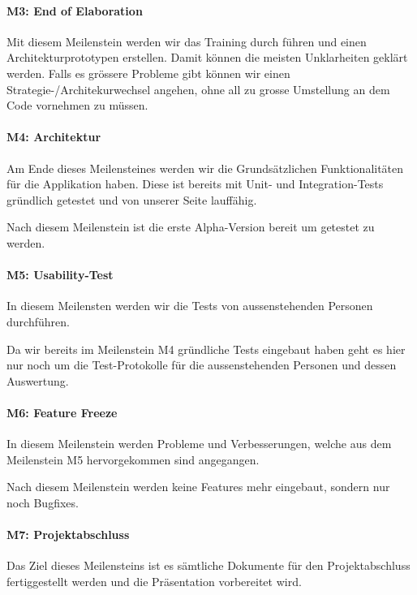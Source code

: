 \documentclass[a4paper]{article}
\begin{document}
\paragraph{M3: End of Elaboration} 

Mit diesem Meilenstein werden wir das Training durch führen und einen Architekturprototypen erstellen.
Damit können die meisten Unklarheiten geklärt werden.
Falls es grössere Probleme gibt können wir einen Strategie-/Architekurwechsel angehen, ohne all zu grosse Umstellung an dem Code vornehmen zu müssen.

\paragraph{M4: Architektur} 

Am Ende dieses Meilensteines werden wir die Grundsätzlichen Funktionalitäten für die Applikation haben.
Diese ist bereits mit Unit- und Integration-Tests gründlich getestet und von unserer Seite lauffähig.

Nach diesem Meilenstein ist die erste Alpha-Version bereit um getestet zu werden.

\paragraph{M5: Usability-Test} 

In diesem Meilensten werden wir die Tests von aussenstehenden Personen durchführen.

Da wir bereits im Meilenstein M4 gründliche Tests eingebaut haben geht es hier nur noch um die Test-Protokolle für die aussenstehenden Personen und dessen Auswertung.

\paragraph{M6: Feature Freeze} 

In diesem Meilenstein werden Probleme und Verbesserungen, welche aus dem Meilenstein M5 hervorgekommen sind angegangen.

Nach diesem Meilenstein werden keine Features mehr eingebaut, sondern nur noch Bugfixes.

\paragraph{M7: Projektabschluss} 

Das Ziel dieses Meilensteins ist es sämtliche Dokumente für den Projektabschluss fertiggestellt werden und die Präsentation vorbereitet wird.
\end{document}
